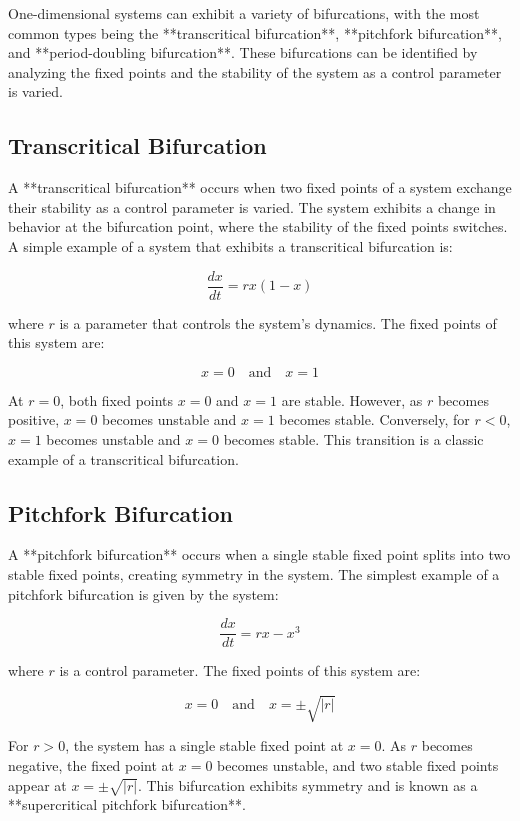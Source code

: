 \documentclass{amsbook}
\begin{document}
One-dimensional systems can exhibit a variety of bifurcations, with the most common types being the **transcritical bifurcation**, **pitchfork bifurcation**, and **period-doubling bifurcation**. These bifurcations can be identified by analyzing the fixed points and the stability of the system as a control parameter is varied.

\subsection{Transcritical Bifurcation}

A **transcritical bifurcation** occurs when two fixed points of a system exchange their stability as a control parameter is varied. The system exhibits a change in behavior at the bifurcation point, where the stability of the fixed points switches. A simple example of a system that exhibits a transcritical bifurcation is:

\[
\frac{dx}{dt} = r x (1 - x)
\]

where \( r \) is a parameter that controls the system's dynamics. The fixed points of this system are:

\[
x = 0 \quad \text{and} \quad x = 1
\]

At \( r = 0 \), both fixed points \( x = 0 \) and \( x = 1 \) are stable. However, as \( r \) becomes positive, \( x = 0 \) becomes unstable and \( x = 1 \) becomes stable. Conversely, for \( r < 0 \), \( x = 1 \) becomes unstable and \( x = 0 \) becomes stable. This transition is a classic example of a transcritical bifurcation.

\subsection{Pitchfork Bifurcation}

A **pitchfork bifurcation** occurs when a single stable fixed point splits into two stable fixed points, creating symmetry in the system. The simplest example of a pitchfork bifurcation is given by the system:

\[
\frac{dx}{dt} = r x - x^3
\]

where \( r \) is a control parameter. The fixed points of this system are:

\[
x = 0 \quad \text{and} \quad x = \pm \sqrt{|r|}
\]

For \( r > 0 \), the system has a single stable fixed point at \( x = 0 \). As \( r \) becomes negative, the fixed point at \( x = 0 \) becomes unstable, and two stable fixed points appear at \( x = \pm \sqrt{|r|} \). This bifurcation exhibits symmetry and is known as a **supercritical pitchfork bifurcation**.
\end{document}
